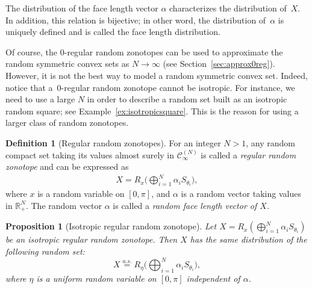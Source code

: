 \documentclass[numbers,compress,v1.0.1]{vmsta}
\newtheorem{proposition}{Proposition}
\theoremstyle{definition}
\newtheorem{definition}{Definition}
\begin{document}
The distribution of the face length vector $\alpha$ characterizes the
distribution of~$X$. In addition, this relation is bijective; in other
word, the distribution of~$\alpha$ is uniquely defined and is called
the face length distribution.

Of course, the $0$-regular random zonotopes can be used to approximate
the random symmetric convex sets as $N\rightarrow\infty$ (see Section~\ref{sec:approx0reg}). However, it is not the best way to model a random
symmetric convex set. Indeed, notice that a~$0$-regular random zonotope
cannot be isotropic. For instance, we need to use a large $N$ in order
to describe a random set built as an isotropic random square; see
Example~\ref{ex:isotropicsquare}. This is the reason for using a larger
class of random zonotopes.

\begin{definition}[Regular random zonotopes]
For an integer $N>1$, any random compact set taking its values almost
surely in $\mathcal{C}^{(N)}_\infty$ is called a \textit{regular random
zonotope} and can be expressed as
%
\begin{align*}
X=R_x\Biggl(\bigoplus_{i=1}^N
\alpha_i S_{\theta_i}\Biggr),
\end{align*}
%
where $x$ is a random variable on $[0,\pi]$, and $\alpha$ is a random
vector taking values in $\mathbb{R}_+^N$. The random vector $\alpha$ is
called a \textit{random face length vector of $X$.}
\end{definition}
%
\begin{proposition}[Isotropic regular random zonotope]
Let $ X=R_x(\bigoplus_{i=1}^N\alpha_i S_{\theta_i})$ be an isotropic
regular random zonotope. Then $X$ has the same distribution of the
following random set:
%
\begin{equation}
X\stackrel{a.s.} {=}R_\eta\Biggl(\bigoplus
_{i=1}^N\alpha_i S_{\theta_i}
\Biggr), \label{eq:representationIRRZ}
\end{equation}
%
where $\eta$ is a uniform random variable on $[0,\pi]$ independent of
$\alpha$.
\end{proposition}
\end{document}
